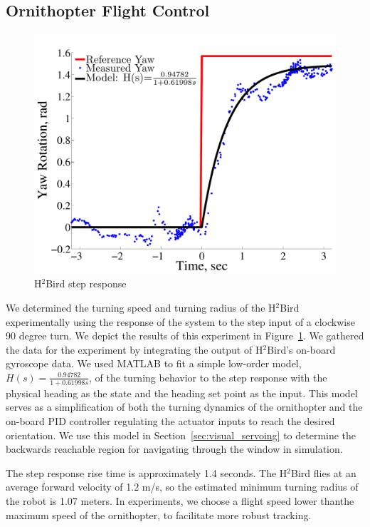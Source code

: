 \documentclass{aamas2013}
\begin{document}
\subsection{Ornithopter Flight Control}
\label{sec:flight_control}
\begin{figure}[tb]
\centering
\includegraphics[width=\linewidth]{figures/step_response_total.pdf}
\caption{H$^2$Bird step response}
\label{fig:step_response}
\end{figure}

We determined the turning speed and turning radius of the H$^2$Bird
experimentally using the response of the system to the step input of a
clockwise 90 degree turn. We depict the results of this experiment in
Figure~\ref{fig:step_response}. We gathered the data for the experiment by 
integrating the output of H$^2$Bird's on-board gyroscope data. We used MATLAB to
fit a simple low-order model, $H(s) = \frac{0.94782}{1+0.61998s}$, of the
turning behavior to the step response with the physical heading as the state
and the heading set point as the input. This model serves as a simplification
of both the turning dynamics of the ornithopter and the on-board PID
controller regulating the actuator inputs to reach the desired orientation. We
use this model in Section~\ref{sec:visual_servoing} to determine the backwards
reachable region for navigating through the window in simulation.

The step response rise time is approximately 1.4 seconds. The H$^2$Bird
flies at an average forward velocity of 1.2 m/s, so the estimated minimum
turning radius of the robot is 1.07 meters. In experiments, we choose a flight
speed lower thanthe maximum speed of the ornithopter, to facilitate more
robust tracking.
\end{document}
